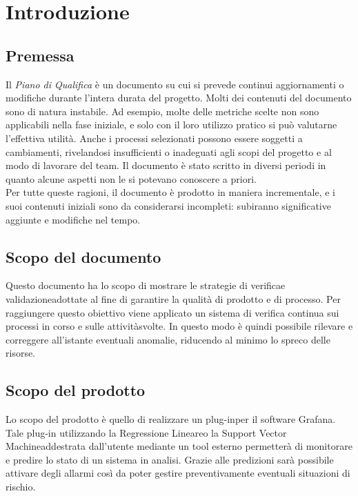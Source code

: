 \section{Introduzione}
\subsection{Premessa}
Il \textit{Piano di Qualifica} è un documento su cui si prevede continui aggiornamenti o modifiche durante l'intera durata del progetto. Molti dei contenuti del documento sono di natura instabile. Ad esempio, molte delle metriche scelte non sono applicabili nella fase iniziale, e solo con il loro utilizzo pratico si può valutarne l'effettiva utilità. Anche i processi selezionati possono essere soggetti a cambiamenti, rivelandosi insufficienti o inadeguati agli scopi del progetto e al modo di lavorare del team. Il documento è stato scritto in diversi periodi in quanto alcune aspetti non le si potevano conoscere a priori. \\
Per tutte queste ragioni, il documento è prodotto in maniera incrementale\glo, e i suoi contenuti iniziali sono da considerarsi incompleti: subiranno significative aggiunte e modifiche nel tempo.

\subsection{Scopo del documento}
Questo documento ha lo scopo di mostrare le strategie di verifica\glo e validazione\glo adottate al fine di garantire la qualità di prodotto e di processo\glo. Per raggiungere questo obiettivo viene applicato un sistema di verifica continua sui processi in corso e sulle attività\glo svolte. In questo modo è quindi possibile rilevare e correggere all'istante eventuali anomalie, riducendo al minimo lo spreco delle risorse.

\subsection{Scopo del prodotto}
Lo scopo del prodotto è quello di realizzare un plug-in\glo per il software Grafana\glo. Tale plug-in utilizzando la Regressione Lineare\glo o la Support Vector Machine\glo addestrata dall'utente mediante un tool esterno permetterà di monitorare e predire lo stato di un sistema in analisi. Grazie alle predizioni sarà possibile attivare degli allarmi così da poter gestire preventivamente eventuali situazioni di rischio. \\




